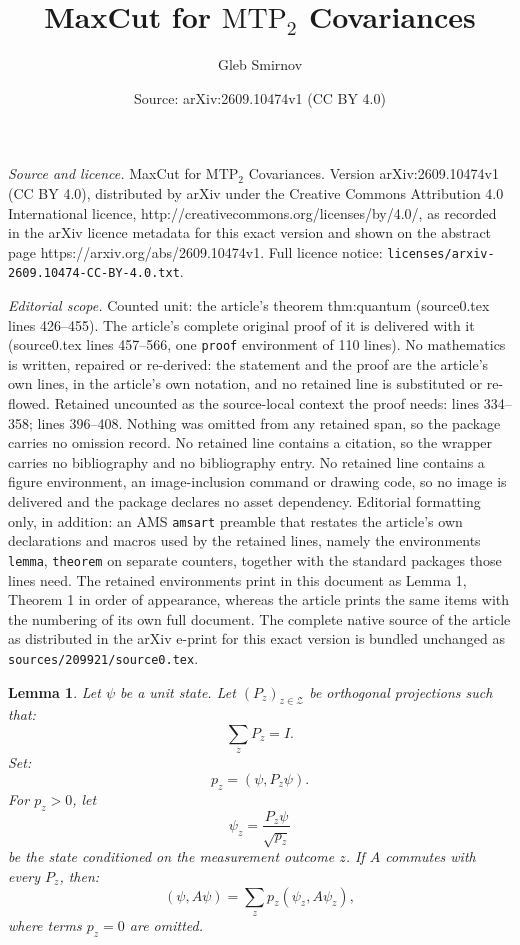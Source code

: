 \documentclass[10pt,a4paper]{amsart}
\title{MaxCut for \(\mathrm{MTP}_2\) Covariances}
\author{Gleb Smirnov}
\date{Source: arXiv:2609.10474v1 (CC BY 4.0)}
\newtheorem{lemma}{Lemma}
\begin{document}
\maketitle

\noindent\emph{Source and licence.} MaxCut for \(\mathrm{MTP}_2\) Covariances. Version arXiv:2609.10474v1 (CC BY 4.0), distributed by arXiv under the Creative Commons Attribution 4.0 International licence, http://creativecommons.org/licenses/by/4.0/, as recorded in the arXiv licence metadata for this exact version and shown on the abstract page https://arxiv.org/abs/2609.10474v1. Full licence notice: \texttt{licenses/arxiv-2609.10474-CC-BY-4.0.txt}.\par\smallskip

\noindent\textit{Editorial scope.} Counted unit: the article's theorem thm:quantum (source0.tex lines 426--455). The article's complete original proof of it is delivered with it (source0.tex lines 457--566, one \texttt{proof} environment of 110 lines). No mathematics is written, repaired or re-derived: the statement and the proof are the article's own lines, in the article's own notation, and no retained line is substituted or re-flowed.  Retained uncounted as the source-local context the proof needs: lines 334--358; lines 396--408.  Nothing was omitted from any retained span, so the package carries no omission record.  No retained line contains a citation, so the wrapper carries no bibliography and no bibliography entry.  No retained line contains a figure environment, an image-inclusion command or drawing code, so no image is delivered and the package declares no asset dependency.  Editorial formatting only, in addition: an AMS \texttt{amsart} preamble that restates the article's own declarations and macros used by the retained lines, namely the environments \texttt{lemma}, \texttt{theorem} on separate counters, together with the standard packages those lines need.  The retained environments print in this document as Lemma 1, Theorem 1 in order of appearance, whereas the article prints the same items with the numbering of its own full document.  The complete native source of the article as distributed in the arXiv e-print for this exact version is bundled unchanged as \texttt{sources/209921/source0.tex}.
\begin{lemma}\label{total}
Let \(\psi\) be a unit state. 
Let \((P_z)_{z \in \mathcal Z}\) be
orthogonal projections such that:
\[
\sum_zP_z=I.
\]
Set:
\[
p_z=(\psi,P_z\psi).
\]
For \(p_z>0\), let
\[
\psi_z=\frac{P_z\psi}{\sqrt{p_z}}
\]
be the state conditioned on the measurement outcome \(z\).
If \(A\) commutes with every \(P_z\), then:
\[
(\psi,A\psi)
=
\sum_{z}
p_z(\psi_z,A\psi_z),
\]
where terms \(p_z=0\) are omitted.
\end{lemma}
\end{document}
